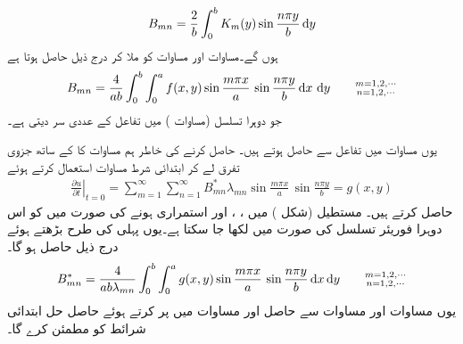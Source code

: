 \begin{align}\label{مساوات_جزوی_دوہرا_فوریئر_تسلسل_ٹ}
B_{mn}=\frac{2}{b}\int_0^b K_m(y)\sin \frac{n\pi y}{b}\dif y
\end{align}
ہوں گے۔مساوات  اور مساوات  کو ملا کر درج ذیل  حاصل ہوتا ہے
\begin{align}\label{مساوات_جزوی_دوہرا_فوریئر_تسلسل_ث}
B_{mn}=\frac{4}{ab}\int_0^b\int_0^a f(x,y)\sin\frac{m\pi x}{a}\,\sin \frac{n\pi y}{b} \dif x\,\dif y\quad \quad \substack{m=1,2,\cdots\\n=1,2,\cdots}
\end{align}
جو دوہرا تسلسل (مساوات ) میں تفاعل  کے عددی سر  دیتی ہے۔

یوں مساوات  میں  تفاعل  سے حاصل ہوتے ہیں۔  حاصل کرنے کی خاطر ہم مساوات  کا  کے ساتھ جزوی تفرق لے کر ابتدائی شرط مساوات  استعمال کرتے ہوئے  
\begin{align*}
\left.\frac{\partial u}{\partial t}\right|_{t=0}=\sum_{m=1}^{\infty}\sum_{n=1}^{\infty} B^*_{mn}\lambda_{mn}\sin\frac{m\pi x}{a}\,\sin\frac{n\pi y}{b}=g(x,y)
\end{align*}
حاصل کرتے ہیں۔ مستطیل  (شکل ) میں ، ،  اور   استمراری ہونے کی صورت میں  کو اس دوہرا فوریئر تسلسل کی صورت میں لکھا جا سکتا ہے۔یوں پہلی کی طرح بڑھتے ہوئے درج ذیل حاصل ہو گا۔
\begin{align}\label{مساوات_جزوی_دوہرا_فوریئر_تسلسل_ج}
B^*_{mn}=\frac{4}{ab\lambda_{mn}}\int_0^b\int_0^a g(x,y) \sin\frac{m\pi x}{a}\,\sin \frac{n\pi y}{b}\dif x\dif y\quad \quad \substack{m=1,2,\cdots\\n=1,2,\cdots}
\end{align}
یوں مساوات  اور مساوات  سے حاصل  اور    مساوات  میں پر کرتے ہوئے حاصل حل ابتدائی شرائط کو مطمئن کرے گا۔


